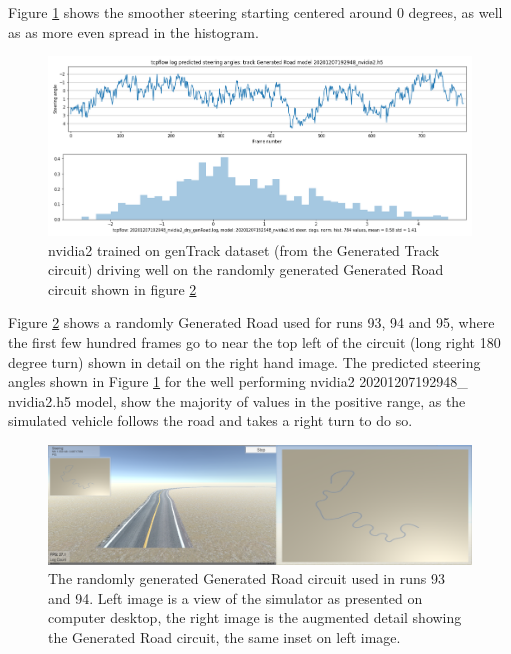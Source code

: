 Figure \ref{fig:20201207192948_nvidia2_dry_genRoad} shows the smoother steering starting centered around 0 degrees, as well as as more even spread in the histogram.
\begin{figure}[ht]
 \centering 
 \includegraphics[width=\textwidth]{Figures/20201207192948_nvidia2_dry_genRoad.png}
 \caption{nvidia2 trained on genTrack dataset (from the Generated Track circuit) driving well on the randomly generated Generated Road circuit shown in figure \ref{fig:run-93-94-generated-road}}
 \label{fig:20201207192948_nvidia2_dry_genRoad} 
\end{figure}

Figure \ref{fig:run-93-94-generated-road} shows a randomly Generated Road used for runs 93, 94 and 95, where the first few hundred frames go to near the top left of the circuit (long right 180 degree turn) shown in detail on the right hand image. The predicted steering angles shown in Figure  \ref{fig:20201207192948_nvidia2_dry_genRoad} for the well performing nvidia2 20201207192948\_ nvidia2.h5 model, show the majority of values in the positive range, as the simulated vehicle follows the road and takes a right turn to do so.

\begin{figure}[ht]
 \centering 
 \includegraphics[width=\textwidth]{Figures/run-93-94-generated-road.png}
 \caption{The randomly generated Generated Road circuit used in runs 93 and 94. Left image is a view of the simulator as presented on computer desktop, the right image is the augmented detail showing the Generated Road circuit, the same inset on left image.}
 \label{fig:run-93-94-generated-road} 
\end{figure}


